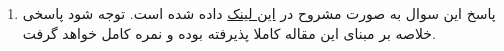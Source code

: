 \begin{enumerate}[label=(\alph*)]
	
	\item
	پاسخ این سوال به صورت مشروح در
	\href{https://arxiv.org/pdf/1703.10593.pdf}{این لینک}
	داده شده است. توجه شود پاسخی خلاصه بر مبنای این مقاله کاملا پذیرفته بوده و نمره کامل خواهد گرفت.
	
\end{enumerate}
